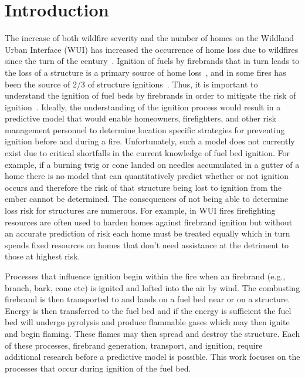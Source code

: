 \section{Introduction}
    The increase of both wildfire severity and the number of homes on the Wildland Urban Interface (WUI) has increased the occurrence of home loss due to wildfires since the turn of the century~\cite{Manzello2013}. Ignition of fuels by firebrands that in turn leads to the loss of a structure is a primary source of home loss~\cite{Koo2010a, Syphard2019, Roberts2021}, and in some fires has been the source of 2/3 of structure ignitions~\cite{Maranghides2013NISTIgnitions}. Thus, it is important to understand the ignition of fuel beds by firebrands in order to mitigate the risk of ignition~\cite{Manzello2014}. Ideally, the understanding of the ignition process would result in a predictive model that would enable homeowners, firefighters, and other risk management personnel to determine location specific strategies for preventing ignition before and during a fire. Unfortunately, such a model does not currently exist due to critical shortfalls in the current knowledge of fuel bed ignition. For example, if a burning twig or cone landed on needles accumulated in a gutter of a home there is no model that can quantitatively predict whether or not ignition occurs and therefore the risk of that structure being lost to ignition from the ember cannot be determined. The consequences of not being able to determine loss risk for structures are numerous. For example, in WUI fires firefighting resources are often used to harden homes against firebrand ignition but without an accurate prediction of risk each home must be treated equally which in turn spends fixed resources on homes that don't need assistance at the detriment to those at highest risk. 
    
    Processes that influence ignition begin within the fire when an firebrand (e.g., branch, bark, cone etc) is ignited and lofted into the air by wind. The combusting firebrand is then transported to and lands on a fuel bed near or on a structure. Energy is then transferred to the fuel bed and if the energy is sufficient the fuel bed will undergo pyrolysis and produce flammable gases which may then ignite and begin flaming. These flames may then spread and destroy the structure. Each of these processes, firebrand generation, transport, and ignition, require additional research before a predictive model is possible. This work focuses on the processes that occur during ignition of the fuel bed.
    
